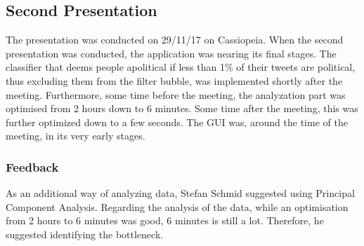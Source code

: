 \subsection{Second Presentation}
The presentation was conducted on 29/11/17 on Cassiopeia. When the second
presentation was conducted, the application was nearing its final stages. The
classifier that deems people apolitical if less than 1\% of their tweets are
political, thus excluding them from the filter bubble, was implemented shortly
after the meeting. Furthermore, some time before the meeting, the analyzation
part was optimised from 2 hours down to 6 minutes. Some time after the meeting,
this was further optimized down to a few seconds. The GUI was, around the time
of the meeting, in its very early stages.

\subsubsection{Feedback}
As an additional way of analyzing data, Stefan Schmid suggested using Principal
Component Analysis. Regarding the analysis of the data, while an optimisation
from 2 hours to 6 minutes was good, 6 minutes is still a lot. Therefore, he
suggested identifying the bottleneck. 

